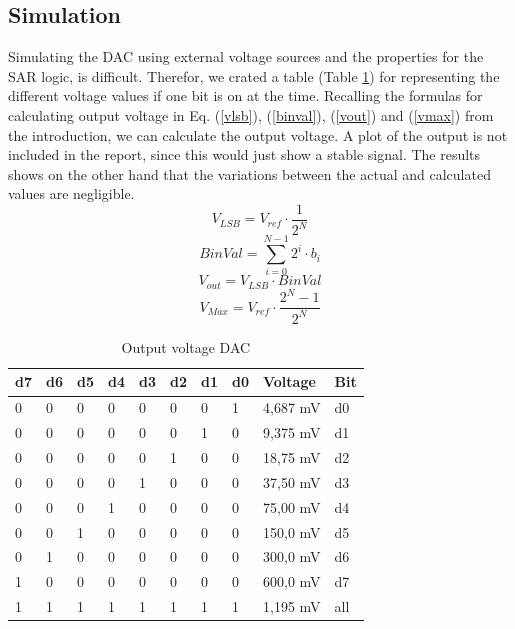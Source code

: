 \documentclass[english, 12pt, a4paper]{ifimaster}
\begin{document}
\subsection{Simulation}
Simulating the DAC using external voltage sources and the properties for the SAR logic, is difficult. Therefor, we crated a table (Table \ref{tab:voltage:out:dac}) for representing the different 
voltage values if one bit is on at the time. Recalling the formulas for calculating output voltage in Eq. (\ref{vlsb}), (\ref{binval}), (\ref{vout}) and (\ref{vmax}) from the introduction, 
we can calculate the output voltage. A plot of the output is not included in the report, since this would just show a stable signal. The results shows on the other hand that the variations between 
the actual and calculated values are negligible. 
\begin{equation}\label{vlsb}
 V_{LSB} = V_{ref} \cdot \frac{1}{2^{N}}
\end{equation}
\begin{equation}\label{binval}
 BinVal = \sum_{i=0}^{N-1} 2^{i} \cdot b_{i}
\end{equation}
\begin{equation}\label{vout}
 V_{out} = V_{LSB} \cdot BinVal
\end{equation}
\begin{equation}\label{vmax}
 V_{Max} = V_{ref} \cdot \frac{2^{N}-1}{2^{N}}
\end{equation}
\begin{table}[!ht]
\centering
\begin{tabular}{|l|l|l|l|l|l|l|l|l|l|}
\hline
d7 & d6 & d5 & d4 & d3 & d2 & d1 & d0 & Voltage  & Bit \\ \hline
0  & 0  & 0  & 0  & 0  & 0  & 0  & 1  & 4,687 mV & d0  \\ \hline
0  & 0  & 0  & 0  & 0  & 0  & 1  & 0  & 9,375 mV & d1  \\ \hline
0  & 0  & 0  & 0  & 0  & 1  & 0  & 0  & 18,75 mV & d2  \\ \hline
0  & 0  & 0  & 0  & 1  & 0  & 0  & 0  & 37,50 mV & d3  \\ \hline
0  & 0  & 0  & 1  & 0  & 0  & 0  & 0  & 75,00 mV & d4  \\ \hline
0  & 0  & 1  & 0  & 0  & 0  & 0  & 0  & 150,0 mV & d5  \\ \hline
0  & 1  & 0  & 0  & 0  & 0  & 0  & 0  & 300,0 mV & d6  \\ \hline
1  & 0  & 0  & 0  & 0  & 0  & 0  & 0  & 600,0 mV & d7  \\ \hline
1  & 1  & 1  & 1  & 1  & 1  & 1  & 1  & 1,195 mV & all \\ \hline
\end{tabular}
\caption{Output voltage DAC}
\label{tab:voltage:out:dac}
\end{table}
\end{document}

